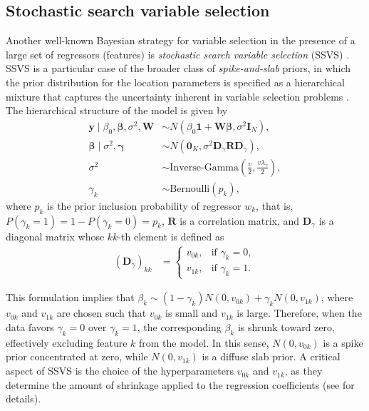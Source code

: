 \subsection{Stochastic search variable selection}\label{sec13_22}
Another well-known Bayesian strategy for variable selection in the presence of a large set of regressors (features) is \textit{stochastic search variable selection} (SSVS) \cite{george1993variable,George1997}. SSVS is a particular case of the broader class of \textit{spike-and-slab} priors, in which the prior distribution for the location parameters is specified as a hierarchical mixture that captures the uncertainty inherent in variable selection problems \cite{Ishwaran2005}. The hierarchical structure of the model is given by
\begin{align*}
	\mathbf{y} \mid \beta_0, \boldsymbol{\beta}, \sigma^2, \mathbf{W} &\sim {N}(\beta_0 \mathbf{1} + \mathbf{W} \boldsymbol{\beta}, \sigma^2 \mathbf{I}_N), \\
	\boldsymbol{\beta} \mid \sigma^2, \boldsymbol{\gamma} &\sim {N}(\mathbf{0}_K, \sigma^2 \mathbf{D}_{\gamma} \mathbf{R} \mathbf{D}_{\gamma}), \\
	\sigma^2 &\sim \text{Inverse-Gamma}\left(\frac{v}{2}, \frac{v\lambda_{\gamma}}{2}\right), \\
	\gamma_k &\sim \text{Bernoulli}(p_k),
\end{align*}
where \(p_k\) is the prior inclusion probability of regressor \(w_k\), that is, \(P(\gamma_k = 1) = 1 - P(\gamma_k = 0) = p_k\), \(\mathbf{R}\) is a correlation matrix, and \(\mathbf{D}_{\gamma}\) is a diagonal matrix whose \(kk\)-th element is defined as
\begin{align*}
	(\mathbf{D}_{\gamma})_{kk} &= 
	\begin{cases}
		v_{0k}, & \text{if } \gamma_k = 0, \\
		v_{1k}, & \text{if } \gamma_k = 1.
	\end{cases}
\end{align*}

This formulation implies that \(\beta_k \sim (1 - \gamma_k) {N}(0, v_{0k}) + \gamma_k {N}(0, v_{1k})\), where \(v_{0k}\) and \(v_{1k}\) are chosen such that \(v_{0k}\) is small and \(v_{1k}\) is large. Therefore, when the data favors \(\gamma_k = 0\) over \(\gamma_k = 1\), the corresponding \(\beta_k\) is shrunk toward zero, effectively excluding feature \(k\) from the model. In this sense, \({N}(0, v_{0k})\) is a spike prior concentrated at zero, while \({N}(0, v_{1k})\) is a diffuse slab prior. A critical aspect of SSVS is the choice of the hyperparameters \(v_{0k}\) and \(v_{1k}\), as they determine the amount of shrinkage applied to the regression coefficients (see \cite{george1993variable,George1997} for details).

